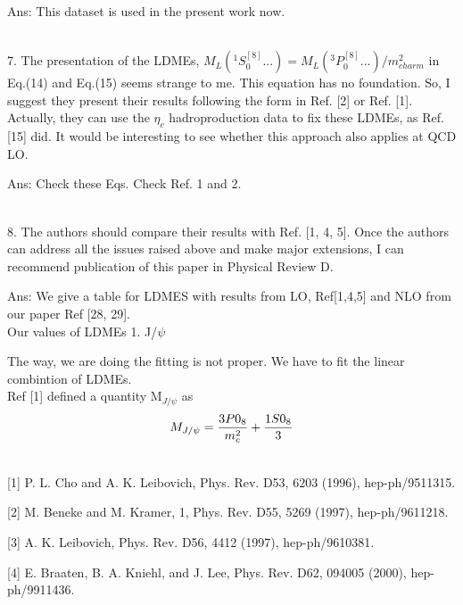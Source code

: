\documentclass[aps,prc,preprint]{revtex4}
\begin{document}
Ans: This dataset is used in the present work now.

\ \\


7. The presentation of the LDMEs, $M_L(^1S^{[8]}_0 ...) = M_L(^3P^{[8]}_0 ...)/m^2_{charm}$
in Eq.(14) and Eq.(15) seems strange to me. This equation has no foundation. 
So, I suggest they present their results following the form in Ref. [2] or Ref. [1]. 
Actually, they can use the $\eta_c$ hadroproduction data to fix these LDMEs, as 
Ref. [15] did. It would be interesting to see whether this approach also applies 
at QCD LO.

Ans: Check these Eqs.  Check Ref. 1 and 2.

\ \\

8. The authors should compare their results with Ref. [1, 4, 5]. Once the authors 
can address all the issues raised above and make major extensions, I can recommend 
publication of this paper in Physical Review D.

Ans: We give a table for LDMES with results from LO, Ref[1,4,5] and 
NLO from our paper Ref [28, 29].\\
Our values of LDMEs
1. J/$\psi$ 





The way, we are doing the fitting is not proper. We have to fit the linear combintion of LDMEs.\\







Ref [1] defined a quantity M$_{J/\psi}$ as 
\begin{equation}
M_{J/\psi} = \frac{3P0_8}{m_{c}^2} + \frac{1S0_8}{3} \\ \nonumber
\end{equation}









\ \\


[1] P. L. Cho and A. K. Leibovich, Phys. Rev. D53, 6203 (1996), hep-ph/9511315.

[2] M. Beneke and M. Kramer, 1, Phys. Rev. D55, 5269 (1997), hep-ph/9611218.

[3] A. K. Leibovich, Phys. Rev. D56, 4412 (1997), hep-ph/9610381.

[4] E. Braaten, B. A. Kniehl, and J. Lee, Phys. Rev. D62, 094005 (2000), hep-ph/9911436.
\end{document}
